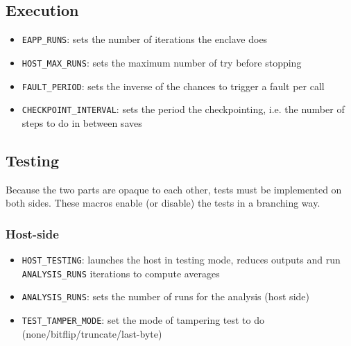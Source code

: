 \documentclass[11pt,a4paper]{report}
\begin{document}
\subsection{Execution}
\begin{itemize}
    \item \verb|EAPP_RUNS|: sets the number of iterations the enclave does
    \item \verb|HOST_MAX_RUNS|: sets the maximum number of try before stopping
    \item \verb|FAULT_PERIOD|: sets the inverse of the chances to trigger a fault per call
    \item \verb|CHECKPOINT_INTERVAL|: sets the period the checkpointing, i.e. the number of steps to do in between saves
    
\end{itemize}
\subsection{Testing}
Because the two parts are opaque to each other, tests must be implemented on both sides. 
These macros enable (or disable) the tests in a branching way. 

\subsubsection{Host-side}
\begin{itemize}
    \item \verb|HOST_TESTING|: launches the host in testing mode, reduces outputs and run\\ \verb|ANALYSIS_RUNS| iterations to compute averages
    \item \verb|ANALYSIS_RUNS|: sets the number of runs for the analysis (host side)
    \item \verb|TEST_TAMPER_MODE|: set the mode of tampering test to do (none/bitflip/truncate/last-byte)
\end{itemize}
\end{document}
